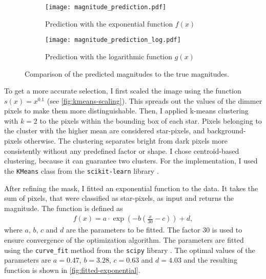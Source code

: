 \begin{figure}[tb]
  \centering
  \begin{subfigure}{.49\textwidth}
    \centering
    \texttt{[image: magnitude\_prediction.pdf]}
    \caption{Prediction with the exponential function $f(x)$}
    \label{fig:prediction-exponential}
  \end{subfigure}%
  \hfill
  \begin{subfigure}{.49\textwidth}
    \centering
    \texttt{[image: magnitude\_prediction\_log.pdf]}
    \caption{Prediction with the logarithmic function $g(x)$}
    \label{fig:prediction-logarithmic}
  \end{subfigure}
  \caption{Comparison of the predicted magnitudes to the true magnitudes.}
  \label{fig:prediction}
\end{figure}

To get a more accurate selection, I first scaled the image using the function $s(x) =
  x^{0.1}$ (see \autoref{fig:kmeans-scaling}). This spreads out the values of the dimmer
pixels to make them more distinguishable. Then, I applied k-means clustering with $k =
  2$ to the pixels within the bounding box of each star. Pixels belonging to the cluster
with the higher mean are considered star-pixels, and background-pixels otherwise. The
clustering separates bright from dark pixels more consistently without any predefined
factor or shape. I chose centroid-based clustering, because it can guarantee two
clusters. For the implementation, I used the \texttt{KMeans} class from the
\texttt{scikit-learn} library \cite{scikit-learn}.

After refining the mask, I fitted an exponential function to the data. It takes the sum of
pixels, that were classified as star-pixels, as input and returns the magnitude. The
function is defined as
\begin{align*}
  f(x) = a \cdot \exp{\left(-b \left(\frac{x}{30} - c\right)\right)} + d,
\end{align*}
where $a$, $b$, $c$ and $d$ are the parameters to be fitted. The factor $30$ is used to
ensure convergence of the optimization algorithm. The parameters are fitted using the
\texttt{curve\_fit} method from the \texttt{scipy} library \cite{scipy2020}. The optimal
values of the parameters are $a = 0.47$, $b = 3.28$, $c = 0.63$ and $d = 4.03$ and the
resulting function is shown in \autoref{fig:fitted-exponential}.

